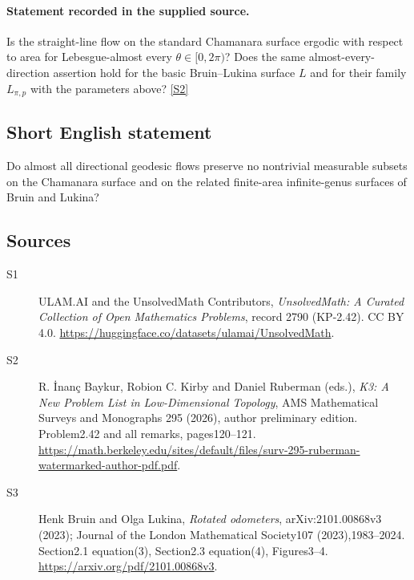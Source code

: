 \documentclass[11pt]{book}
\newcommand{\sref}[2]{\hyperlink{source:#1:#2}{[S#2]}}
\begin{document}
\paragraph{Statement recorded in the supplied source.}
Is the straight-line flow on the standard Chamanara surface ergodic with respect to area for Lebesgue-almost every $\theta\in[0,2\pi)$? Does the same almost-every-direction assertion hold for the basic Bruin--Lukina surface $L$ and for their family $L_{\pi,p}$ with the parameters above? \sref{2790}{2}
\subsection{Short English statement}
Do almost all directional geodesic flows preserve no nontrivial measurable subsets on the Chamanara surface and on the related finite-area infinite-genus surfaces of Bruin and Lukina?
\subsection{Sources}
\begin{description}
\item[\hypertarget{source:2790:1}{S1}] ULAM.AI and the UnsolvedMath Contributors, \emph{UnsolvedMath: A Curated Collection of Open Mathematics Problems}, record 2790 (KP-2.42). CC BY 4.0. \url{https://huggingface.co/datasets/ulamai/UnsolvedMath}.
\item[\hypertarget{source:2790:2}{S2}] R. İnanç Baykur, Robion C. Kirby and Daniel Ruberman (eds.), \emph{K3: A New Problem List in Low-Dimensional Topology}, AMS Mathematical Surveys and Monographs 295 (2026), author preliminary edition. Problem2.42 and all remarks, pages120--121. \url{https://math.berkeley.edu/sites/default/files/surv-295-ruberman-watermarked-author-pdf.pdf}.
\item[\hypertarget{source:2790:3}{S3}] Henk Bruin and Olga Lukina, \emph{Rotated odometers}, arXiv:2101.00868v3 (2023); Journal of the London Mathematical Society107 (2023),1983--2024. Section2.1 equation(3), Section2.3 equation(4), Figures3--4. \url{https://arxiv.org/pdf/2101.00868v3}.
\end{description}
\label{end:2790}
\end{document}
